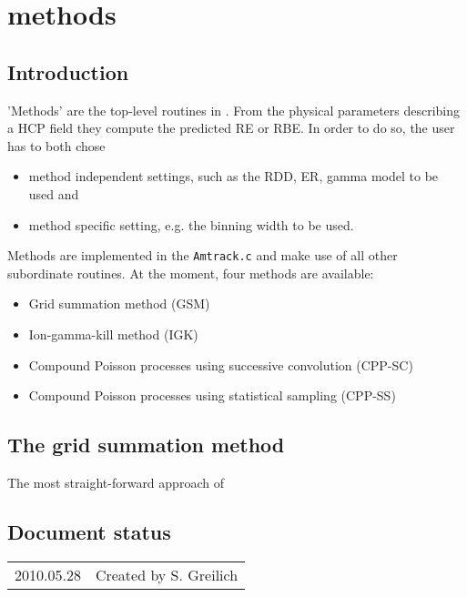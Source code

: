 
\chapter{\la{} methods}

\section{Introduction}
'Methods' are the top-level routines in \la{}. From the physical parameters describing a HCP field they compute the predicted RE or RBE. In order to do so, the user has to both chose 
\begin{itemize}
\item{method independent settings, such as the RDD, ER, gamma model to be used and}
\item{method specific setting, e.g. the binning width to be used.}
\end{itemize}

Methods are implemented in the \texttt{Amtrack.c} and make use of all other subordinate routines. At the moment, four methods are available:
\begin{itemize}
\item{Grid summation method (GSM)}
\item{Ion-gamma-kill method (IGK)}
\item{Compound Poisson processes using successive convolution (CPP-SC)}
\item{Compound Poisson processes using statistical sampling (CPP-SS)}
\end{itemize}

\section{The grid summation method}
The most straight-forward approach of


\section*{Document status}
\begin{tabular}{l l}
2010.05.28&Created by S. Greilich
\end{tabular}